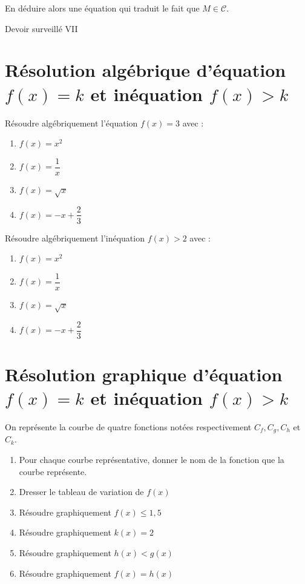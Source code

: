 \documentclass[french]{book}
\begin{document}
En déduire alors une équation qui traduit le fait que $M \in \mathcal{C}$.



\newpage

\begin{center}
\huge{ Devoir surveillé VII}
\end{center}
 
\vspace{1cm}
\pagestyle{empty}

\section*{Résolution algébrique d’équation $f(x)=k$ et inéquation $f(x)>k$ }

Résoudre algébriquement l’équation $f(x)=3$ avec : \\

\begin{enumerate}
\item $f(x)=x^2 $
\item $f(x)=\dfrac{1}{x}$
\item $f(x)=\sqrt{x}$
\item $f(x)=-x+ \dfrac{2}{3} $
\end{enumerate}

Résoudre algébriquement l’inéquation $f(x)>2$ avec : \\

\begin{enumerate}
\item $f(x)=x^2 $
\item $f(x)=\dfrac{1}{x}$
\item $f(x)=\sqrt{x}$
\item $f(x)=-x+ \dfrac{2}{3} $
\end{enumerate}

\section*{ Résolution graphique d’équation $f(x)=k$ et inéquation $f(x)>k$ }

On représente la courbe de quatre fonctions notées respectivement $C_f,C_g,C_h$ et $C_k$.

\begin{enumerate}
\item Pour chaque courbe représentative, donner le nom de la fonction que la courbe représente.
\item Dresser le tableau de variation de $f(x)$
\item Résoudre graphiquement $f(x) \leq 1,5$
\item Résoudre graphiquement $k(x) = 2$
\item Résoudre graphiquement $h(x)<g(x)$
\item Résoudre graphiquement $f(x)=h(x)$
\end{enumerate}
\end{document}
